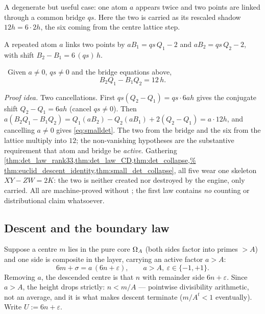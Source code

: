 A degenerate but useful case: one atom $a$ appears twice and two points are linked through a common
bridge $qs$. Here the two is carried as its rescaled shadow $12h=6\cdot 2h$, the six coming from the
centre lattice step.

\begin{definition}\label{def:bridge}
A repeated atom $a$ links two points by $a B_1=qs\,Q_1-2$ and $a B_2=qs\,Q_2-2$, with shift
$B_2-B_1=6\,(qs)\,h$.
\end{definition}

\begin{theorem}\label{thm:small_det_collapse}
\green{}\ Given $a\ne 0$, $qs\ne 0$ and the bridge equations above,
\begin{equation}\label{eq:smalldet}
B_2 Q_1-B_1 Q_2=12\,h.
\end{equation}
\end{theorem}

\emph{Proof idea.} Two cancellations. First $qs(Q_2-Q_1)=qs\cdot 6ah$ gives the conjugate shift
$Q_2-Q_1=6ah$ (cancel $qs\ne 0$). Then $a(B_2 Q_1-B_1 Q_2)=Q_1(aB_2)-Q_2(aB_1)+2(Q_2-Q_1)=a\cdot12h$,
and cancelling $a\ne 0$ gives \cref{eq:smalldet}. The two from the bridge and the six from the
lattice multiply into $12$; the non-vanishing hypotheses are the substantive requirement that atom
and bridge be \emph{active}. Gathering \cref{thm:det_law_rank33,thm:det_law_CD,thm:det_collapse,%
thm:euclid_descent_identity,thm:small_det_collapse}, all five wear one skeleton $XY-ZW=2K$: the two
is neither created nor destroyed by the engine, only carried. All are machine-proved without
; the first law contains \emph{no} counting or distributional claim whatsoever.

\subsection{Descent and the boundary law}

Suppose a centre $m$ lies in the pure core $\Omega_A$ (both sides factor into primes $>A$) and one
side is composite in the layer, carrying an active factor $a>A$:
\begin{equation}\label{eq:descent-step}
6m+\sigma=a\,(6n+\varepsilon),\qquad a>A,\ \varepsilon\in\{-1,+1\}.
\end{equation}
Removing $a$, the descended centre is that $n$ with remainder side $6n+\varepsilon$. Since $a>A$,
the height drops strictly: $n<m/A$ --- pointwise divisibility arithmetic, not an average, and it is
what makes descent terminate ($m/A^t<1$ eventually). Write $U:=6n+\varepsilon$.

